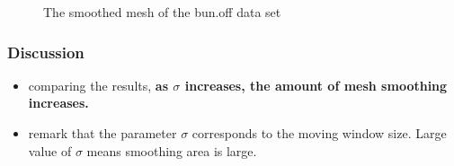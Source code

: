 \documentclass[paper=a4, fontsize=11pt]{scrartcl} %
\numberwithin{equation}{section} %
\numberwithin{figure}{section} %
\numberwithin{table}{section} %
\begin{document}
\begin{figure}[H]
\caption{The smoothed mesh of the bun.off data set\label{fig:simple}}
\centering
{}
\end{figure}

\subsubsection{Discussion}

\begin{itemize}
	\item comparing the results, \textbf{as $\sigma$ increases, the amount of mesh smoothing increases.} 
	\item remark that the parameter $\sigma$ corresponds to the moving window size. Large value of $\sigma$ means smoothing area is large.
\end{itemize}
\end{document}
